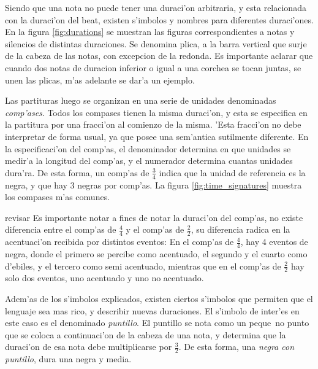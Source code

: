 Siendo que una nota no puede tener una duraci'on arbitraria, y esta relacionada con la duraci'on del beat, existen s'imbolos y nombres para diferentes duraci'ones. 
En la figura \ref{fig:durations} se muestran las figuras correspondientes a notas y silencios de distintas duraciones. Se denomina plica, a la barra vertical que surje 
de la cabeza de las notas, con excepcion de la redonda. Es importante aclarar que cuando dos notas de duracion inferior o igual a una corchea se tocan juntas, 
se unen las plicas, m'as adelante se dar'a un ejemplo.

\begin{imagen}
    \width{12cm}
\end{imagen}

Las partituras luego se organizan en una serie de unidades denominadas \emph{comp'ases}. Todos los compases tienen la misma duraci'on, y esta se especifica
en la partitura por una fracci'on al comienzo de la misma. 'Esta fracci'on no debe interpretar de forma usual, ya que posee una sem'antica sutilmente diferente.
En la especificaci'on del comp'as, el denominador determina en que unidades se medir'a la longitud del comp'as, y el numerador determina cuantas unidades dura'ra.
De esta forma, un comp'as de $\frac{3}{4}$ indica que la unidad de referencia es la negra, y que hay $3$ negras por comp'as.
La figura \ref{fig:time_signatures} muestra los compases m'as comunes. 

\begin{imagen}
    \width{5cm}
\end{imagen}

\alert{revisar}
Es importante notar a fines de notar la duraci'on del comp'as, no existe diferencia entre el comp'as de $\frac{4}{4}$ y el comp'as de $\frac{2}{2}$, su diferencia
radica en la acentuaci'on recibida por distintos eventos: En el comp'as de $\frac{4}{4}$, hay 4 eventos de negra, donde el primero se percibe como acentuado, 
el segundo y el cuarto como d'ebiles, y el tercero como semi acentuado, mientras que en el comp'as de $\frac{2}{2}$ hay solo dos eventos, uno acentuado y uno no 
acentuado. 

Adem'as de los s'imbolos explicados, existen ciertos s'imbolos que permiten que el lenguaje sea mas rico, y describir nuevas duraciones. El s'imbolo de inter'es
en este caso es el denominado \emph{puntillo}. El puntillo se nota como un peque~no punto que se coloca a continuaci'on de la cabeza de una nota, 
y determina que la duraci'on de esa nota debe multiplicarse por $\frac{3}{2}$. De esta forma, una \emph{negra con puntillo}, dura una negra y media. 

